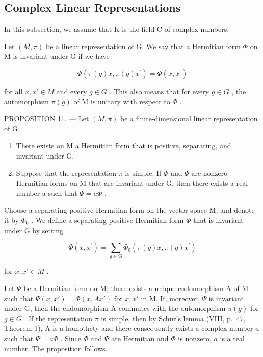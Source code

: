 \subsection{Complex Linear Representations}

In this subsection, we assume that K is the field C of complex numbers.

Let \((M,\pi)\) be a linear representation of G. We say that a Hermitian form \(\Phi\) on M is invariant under G if we have

\[
\Phi (\pi (g) x, \pi (g) x ^ {\prime}) = \Phi (x, x ^ {\prime})\tag{48}
\]

for all \(x, x' \in M\) and every \(g \in G\) . This also means that for every \(g \in G\) , the automorphism \(\pi(g)\) of M is unitary with respect to \(\Phi\) .

PROPOSITION 11. --- Let \((M,\pi)\) be a finite-dimensional linear representation of G.

\begin{enumerate}
\def\labelenumi{\alph{enumi})}
\item
  There exists on M a Hermitian form that is positive, separating, and invariant under G.
\item
  Suppose that the representation \(\pi\) is simple. If \(\Phi\) and \(\Psi\) are nonzero Hermitian forms on M that are invariant under G, then there exists a real number a such that \(\Psi = a\Phi\) .
\end{enumerate}

Choose a separating positive Hermitian form on the vector space M, and denote it by \(\Phi_{0}\) . We define a separating positive Hermitian form \(\Phi\) that is invariant under G by setting

\[
\Phi (x, x ^ {\prime}) = \sum_ {g \in \mathrm{G}} \Phi_ {0} (\pi (g) x, \pi (g) x ^ {\prime})\tag{49}
\]

for \(x, x' \in M\) .

Let \(\Psi\) be a Hermitian form on M; there exists a unique endomorphism A of M such that \(\Psi(x, x') = \Phi(x, Ax')\) for \(x, x'\) in M. If, moreover, \(\Psi\) is invariant under G, then the endomorphism A commutes with the automorphism \(\pi(g)\) for \(g \in G\) . If the representation \(\pi\) is simple, then by Schur's lemma (VIII, p.~47, Theorem 1), A is a homothety and there consequently exists a complex number \(a\) such that \(\Psi = a\Phi\) . Since \(\Phi\) and \(\Psi\) are Hermitian and \(\Phi\) is nonzero, \(a\) is a real number. The proposition follows.

